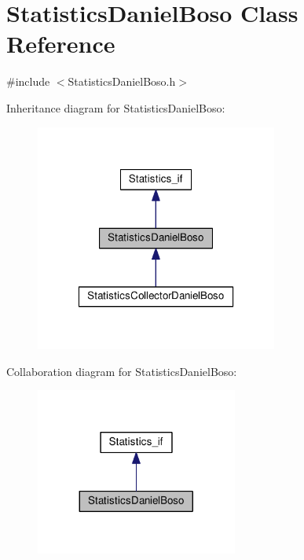\hypertarget{class_statistics_daniel_boso}{\section{Statistics\-Daniel\-Boso Class Reference}
\label{class_statistics_daniel_boso}
}


{\ttfamily \#include $<$Statistics\-Daniel\-Boso.\-h$>$}



Inheritance diagram for Statistics\-Daniel\-Boso\-:
\nopagebreak
\begin{figure}[H]
\begin{center}
\leavevmode
\includegraphics[width=226pt]{class_statistics_daniel_boso__inherit__graph}
\end{center}
\end{figure}


Collaboration diagram for Statistics\-Daniel\-Boso\-:
\nopagebreak
\begin{figure}[H]
\begin{center}
\leavevmode
\includegraphics[width=188pt]{class_statistics_daniel_boso__coll__graph}
\end{center}
\end{figure}
